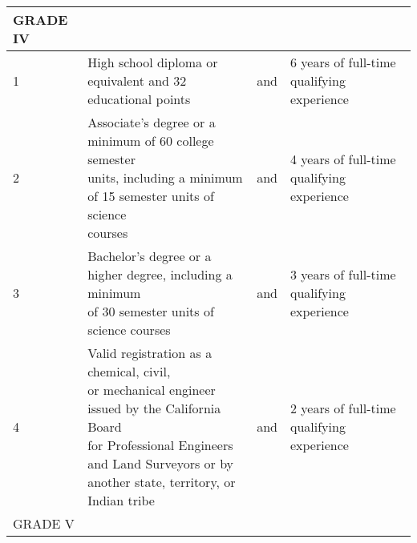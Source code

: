 \begin{table}[H]
\begin{tabular}{|l|p{6.5cm}|l|p{6.5cm}|}
GRADE IV  &                                                                                                                                                                                                                                                                                               &     &                                                                                                 \\ \hline
1         & High  school  diploma    or  equivalent  and    32 educational points                                                                                                                                                                                                                         & and & 6    years    of      full-time    qualifying   experience                                      \\ \hline
2         & \makecell[l]{Associate’s   degree   or     a  minimum   of     60 college semester \\units, including a minimum of 15 semester units of   science\\ courses                                                                                                                                                   } & and & 4    years    of      full-time    qualifying   experience                                      \\ \hline
3         & \makecell[l]{Bachelor’s   degree   or     a   higher   degree, including a minimum\\ of 30 semester   units of science courses                                                                                                                                                                              } & and & 3    years    of      full-time    qualifying   experience                                      \\ \hline
4         &\makecell[l]{ Valid  registration  as    a  chemical,  civil,\\or mechanical     engineer     issued     by the California  Board \\ for    Professional  Engineers and  Land    Surveyors  or  by\\ another  state, territory, or   Indian tribe                                                   } & and & 2    years    of      full-time    qualifying   experience                                      \\ \hline
GRADE V   &                                                                                                                                                                                                                                                                                               &     &                                                                                                 \\ \hline

\end{tabular}
\end{table}
